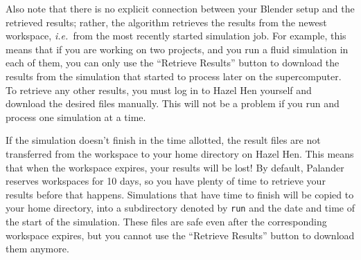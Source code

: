 \documentclass[12pt]{article}
\newcommand{\ie}{\emph{i.e.\ }}
\begin{document}
Also note that there is no explicit connection between your Blender setup and the retrieved results; rather, 
the algorithm retrieves the results from the newest workspace, \ie from the most recently started simulation 
job. For example, this means that if you are working on two projects, and you run a fluid simulation in each 
of them, you can only use the ``Retrieve Results'' button to download the results from the simulation that 
started to process later on the supercomputer. To retrieve any other results, you must log in to Hazel Hen 
yourself and download the desired files manually. This will not be a problem if you run and process one 
simulation at a time.

If the simulation doesn't finish in the time allotted, the result files are not transferred from the 
workspace to your home directory on Hazel Hen. This means that when the workspace expires, your results will 
be lost! By default, Palander reserves workspaces for 10 days, so you have plenty of time to retrieve your 
results before that happens. Simulations that have time to finish will be copied to your home directory, into 
a subdirectory denoted by \verb|run| and the date and time of the start of the simulation. These files are 
safe even after the corresponding workspace expires, but you cannot use the ``Retrieve Results'' button to 
download them anymore.
\end{document}
